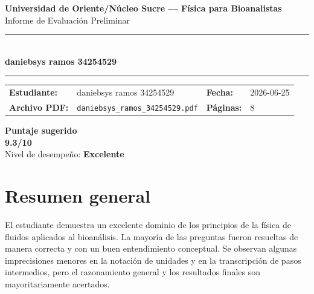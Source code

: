 \documentclass[11pt,a4paper]{article}
\begin{document}
\begin{center}
  {\Large\bfseries\color{azulTitulo} Universidad de Oriente/Núcleo Sucre --- Física para Bioanalistas}\\[4pt]
  {\large Informe de Evaluación Preliminar}\\[12pt]
  \rule{\linewidth}{1.2pt}\\[6pt]
  {\LARGE\bfseries daniebsys ramos 34254529}\\[4pt]
  \rule{\linewidth}{0.6pt}
\end{center}

\vspace{4pt}
\begin{tcolorbox}[cajaTitulo, title=Datos del informe]
\begin{tabular}{@{}llll@{}}
  \textbf{Estudiante:}  & daniebsys ramos 34254529  &
  \textbf{Fecha:}       & 2026-06-25 \\[4pt]
  \textbf{Archivo PDF:} & \texttt{daniebsys\_ramos\_34254529.pdf}  &
  \textbf{Páginas:}     & 8 \\
\end{tabular}
\end{tcolorbox}

\vspace{6pt}
\begin{center}
  \begin{tcolorbox}[
    enhanced,
    colback=white, colframe=desempeno_excelente,
    width=0.62\linewidth,
    boxrule=2pt,
    halign=center, valign=center,
    top=8pt, bottom=8pt,
  ]
    \centering
    {\large\bfseries Puntaje sugerido}\\[6pt]
    {\Huge\bfseries\color{desempeno_excelente} 9.3/10}\\[6pt]
    {\large Nivel de desempeño: \textbf{\color{desempeno_excelente} Excelente}}
  \end{tcolorbox}
\end{center}

\section*{Resumen general}
El estudiante demuestra un excelente dominio de los principios de la física de fluidos aplicados al bioanálisis. La mayoría de las preguntas fueron resueltas de manera correcta y con un buen entendimiento conceptual. Se observan algunas imprecisiones menores en la notación de unidades y en la transcripción de pasos intermedios, pero el razonamiento general y los resultados finales son mayoritariamente acertados.
\end{document}
